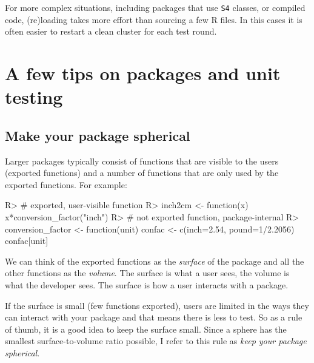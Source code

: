 \documentclass[11pt]{article}
\newcommand{\code}[1]{\texttt{#1}}
\begin{document}
For more complex situations, including packages that use \code{S4} classes, or
compiled code, (re)loading takes more effort than sourcing a few R files.  In
this cases it is often easier to restart a clean cluster for each test round.















\section{A few tips on packages and unit testing}


\subsection{Make your package spherical}
\label{sect:spherical}

Larger packages typically consist of functions that are visible to the users
(exported functions) and a number of functions that are only used by the
exported functions. For example:

\begin{Schunk}
\begin{Sinput}
R> # exported, user-visible function
R> inch2cm <- function(x){
     x*conversion_factor("inch")
   }
R> # not exported function, package-internal
R> conversion_factor <- function(unit){
     confac <- c(inch=2.54, pound=1/2.2056)
     confac[unit]
   }
\end{Sinput}
\end{Schunk}

We can think of the exported functions as the \emph{surface} of the package and
all the other functions as the \emph{volume}. The surface is what a user sees,
the volume is what the developer sees. The surface is how a user interacts with
a package. 


If the surface is small (few functions exported), users are limited in the ways
they can interact with your package and that means there is less to test. So as
a rule of thumb, it is a good idea to keep the surface small. Since a sphere
has the smallest surface-to-volume ratio possible, I refer to this rule as
\emph{keep your package spherical}.
\end{document}
